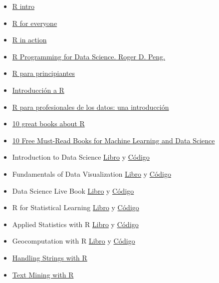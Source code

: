 \documentclass[]{article}
\providecommand{\tightlist}{%
  \setlength{\itemsep}{0pt}\setlength{\parskip}{0pt}}
\begin{document}
\begin{itemize}
\tightlist
\item
  \href{https://cran.r-project.org/doc/manuals/R-intro.pdf}{R intro}
\item
  \href{https://www.jaredlander.com/r-for-everyone/}{R for everyone}
\item
  \href{https://www.manning.com/books/r-in-action-second-edition}{R in
  action}
\item
  \href{https://leanpub.com/rprogramming}{R Programming for Data
  Science. Roger D. Peng.}
\item
  \href{https://cran.r-project.org/doc/contrib/rdebuts_es.pdf}{R para
  principiantes}
\item
  \href{https://cran.r-project.org/doc/contrib/R-intro-1.1.0-espanol.1.pdf}{Introducción
  a R}
\item
  \href{https://www.datanalytics.com/libro_r/}{R para profesionales de
  los datos: una introducción}
\item
  \href{https://www.datasciencecentral.com/profiles/blogs/10-great-books-about-r-1}{10
  great books about R}
\item
  \href{https://www.kdnuggets.com/2017/04/10-free-must-read-books-machine-learning-data-science.html?utm_content=bufferc386f\&utm_medium=social\&utm_source=twitter.com\&utm_campaign=buffer}{10
  Free Must-Read Books for Machine Learning and Data Science}
\item
  Introduction to Data Science
  \href{https://rafalab.github.io/dsbook/}{Libro} y
  \href{https://github.com/rafalab/dsbook}{Código}
\item
  Fundamentals of Data Visualization
  \href{http://serialmentor.com/dataviz/?utm_content=buffer7a991\&utm_medium=social\&utm_source=linkedin.com\&utm_campaign=buffer}{Libro}
  y \href{https://github.com/clauswilke/dataviz}{Código}
\item
  Data Science Live Book
  \href{https://livebook.datascienceheroes.com/}{Libro} y
  \href{https://github.com/pablo14/data-science-live-book}{Código}
\item
  R for Statistical Learning
  \href{https://daviddalpiaz.github.io/r4sl/}{Libro} y
  \href{https://github.com/daviddalpiaz/r4sl}{Código}
\item
  Applied Statistics with R
  \href{https://daviddalpiaz.github.io/appliedstats/}{Libro} y
  \href{https://github.com/daviddalpiaz/appliedstats}{Código}
\item
  Geocomputation with R
  \href{https://geocompr.robinlovelace.net/}{Libro} y
  \href{https://github.com/Robinlovelace/geocompr/}{Código}
\item
  \href{http://www.gastonsanchez.com/r4strings/}{Handling Strings with
  R}
\item
  \href{https://www.tidytextmining.com/}{Text Mining with R}
\end{itemize}
\end{document}
